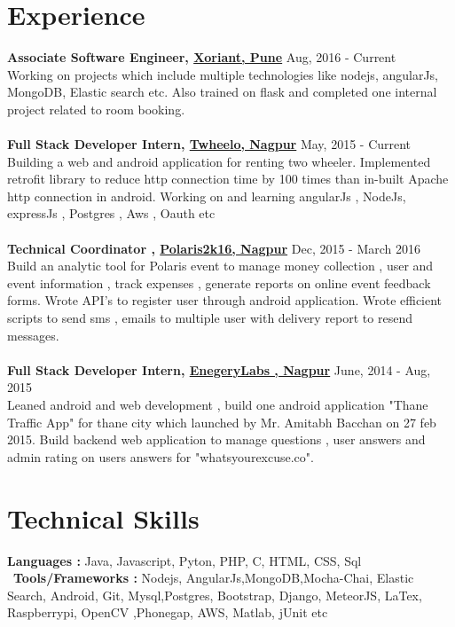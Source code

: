 \documentclass[margin, centered]{res}
\begin{document}
\begin{resume}
\section{Experience}
\textbf{Associate Software Engineer, \href{http://www.xoriant.com}{Xoriant, Pune}} \hfill Aug, 2016 - Current\\
Working on projects which include multiple technologies like nodejs, angularJs, MongoDB, Elastic search etc. Also trained on flask and completed one internal project related to room booking. 
\\
\\
\textbf{Full Stack Developer Intern, \href{http://www.twheelo.com}{Twheelo, Nagpur}} \hfill May, 2015 - Current\\
Building a web and android application for renting two wheeler. 
Implemented retrofit library to reduce http connection time by 100 times than in-built Apache http connection in android. 
Working on and learning  angularJs , NodeJs, expressJs , Postgres , Aws , Oauth  etc
\\
\\
\textbf{Technical Coordinator , \href{http://www.polaris2k16.in/}{Polaris2k16, Nagpur}} \hfill Dec, 2015 - March 2016 \\
Build an analytic tool for Polaris event  to manage money collection , user and event information , track expenses , 
generate reports on online event feedback forms.  
Wrote API's to register user through android application.
Wrote efficient scripts to send sms , emails to multiple user with delivery report to resend messages.\\
\\
\textbf{Full Stack Developer Intern, \href{http://www.energylabs.in/}{EnegeryLabs , Nagpur}}
 \hfill June, 2014 - Aug, 2015 \\ 
Leaned android and web development , build one android application "Thane Traffic App" for thane city 
which  launched by Mr. Amitabh Bacchan on 27 feb 2015. 
Build backend web application to manage questions , user answers and admin rating on users answers 
for "whatsyourexcuse.co".
\

\section{Technical Skills}
\textbf{Languages : }
	Java, Javascript, Pyton, PHP, C, HTML, CSS, Sql \\
\
\textbf{Tools/Frameworks : }
Nodejs, AngularJs,MongoDB,Mocha-Chai, Elastic Search, Android, Git, Mysql,Postgres, Bootstrap, Django, MeteorJS, LaTex, Raspberrypi, OpenCV ,Phonegap, AWS, Matlab, jUnit etc
\	
	

\end{resume}
\end{document}
